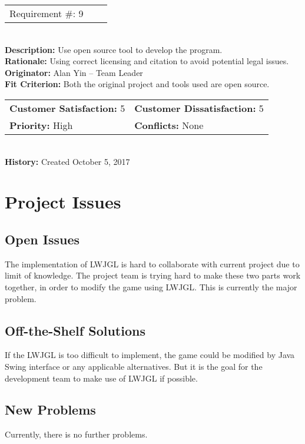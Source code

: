 \documentclass[12pt]{article}
\begin{document}
\begin{reqbox}
\begin{tabular}{ccc}Requirement \#: 9
\end{tabular} \\
\textbf{Description:} Use open source tool to develop the program.\\
\textbf{Rationale:} Using correct licensing and citation to avoid potential legal issues.\\
\textbf{Originator:} Alan Yin -- Team Leader \\
\textbf{Fit Criterion:} Both the original project and tools used are open source.\\
\begin{tabular}{ll}
\textbf{Customer Satisfaction:} 5 & \textbf{Customer Dissatisfaction:} 5 \\
\textbf{Priority:} High & \textbf{Conflicts:} None\\
\end{tabular} \\
\textbf{History:} Created October 5, 2017
\end{reqbox}


\section{Project Issues}

\subsection{Open Issues}
The implementation of LWJGL is hard to collaborate with current project due to limit of knowledge. The project team is trying hard to make these two parts work together, in order to modify the game using LWJGL. This is currently the major problem.

\subsection{Off-the-Shelf Solutions}
If the LWJGL is too difficult to implement, the game could be modified by Java Swing interface or any applicable alternatives. But it is the goal for the development team to make use of LWJGL if possible.

\subsection{New Problems}
Currently, there is no further problems.
\end{document}
